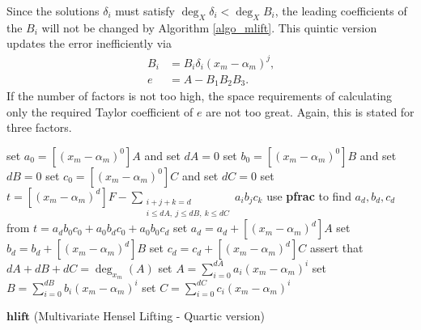 \documentclass[11pt,reqno]{amsart}
\numberwithin{equation}{section}
\newcommand{\op}[1]  { \operatorname{ #1 }}
\begin{document}
Since the solutions $\delta_i$ must satisfy $\op{deg}_{X} \delta_i <
\op{deg}_{X} B_i$, the leading coefficients of the $B_i$ will not be changed by
Algorithm \ref{algo_mlift}. This quintic version updates the error
inefficiently via
\begin{align*}
B_i &= B_i \delta_i(x_m - \alpha_m)^j\text{,} \\
e &= A - B_1 B_2 B_3\text{.}
\end{align*}
If the number of factors is not too high, the space requirements of calculating
only the required Taylor coefficient of $e$ are not too great. Again, this is
stated for three factors.

\newpage

\begin{algorithm}[H]
\DontPrintSemicolon
{}

set $a_0 = [(x_m - \alpha_m)^0] A$ and set $dA = 0$\;
set $b_0 = [(x_m - \alpha_m)^0] B$ and set $dB = 0$\;
set $c_0 = [(x_m - \alpha_m)^0] C$ and set $dC = 0$\;
\For{$d=1$ \KwTo $\op{deg}_{x_m}(A)$}
{
	set $t = [(x_m - \alpha_m)^d]F - \sum_{\substack{i+j+k=d \\ i \le dA, \ j
\le dB, \ k \le dC}} a_i b_j c_k$\;
	use \textbf{pfrac} to find $a_d, b_d, c_d$ from $t=a_d b_0 c_0+a_0 b_d
c_0+a_0 b_0 c_d$\;
	set $a_d = a_d + [(x_m - \alpha_m)^d]A$\;
	set $b_d = b_d + [(x_m - \alpha_m)^d]B$\;
	set $c_d = c_d + [(x_m - \alpha_m)^d]C$\;
	\lIf{$dA + dB + dC > \op{deg}_{x_m}(A)$}{\Return{FAIL}}
}
assert that $dA + dB + dC = \op{deg}_{x_m}(A)$\;
set $A = \sum_{i=0}^{dA} a_i (x_m - \alpha_m)^i$\;
set $B = \sum_{i=0}^{dB} b_i (x_m - \alpha_m)^i$\;
set $C = \sum_{i=0}^{dC} c_i (x_m - \alpha_m)^i$\;
\caption{$\textbf{hlift}$ (Multivariate Hensel Lifting - Quartic version)}
\label{algo_mlift2}
\end{algorithm}
\end{document}
